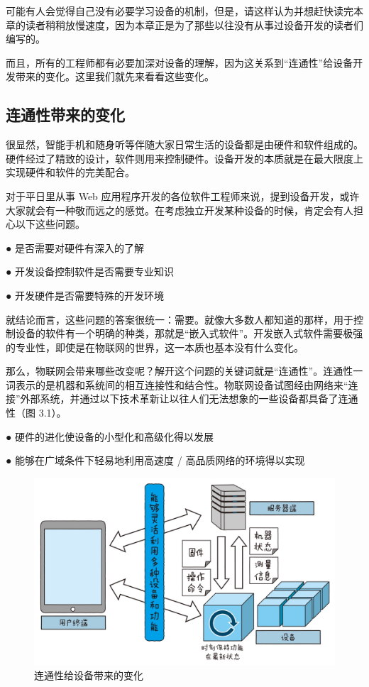 \documentclass[12pt,UTF8]{ctexbook}
\begin{document}
可能有人会觉得自己没有必要学习设备的机制，但是，请这样认为并想赶快读完本章的读者稍稍放慢速度，因为本章正是为了那些以往没有从事过设备开发的读者们编写的。

而且，所有的工程师都有必要加深对设备的理解，因为这关系到“连通性”给设备开发带来的变化。这里我们就先来看看这些变化。

\subsection{连通性带来的变化}

很显然，智能手机和随身听等伴随大家日常生活的设备都是由硬件和软件组成的。硬件经过了精致的设计，软件则用来控制硬件。设备开发的本质就是在最大限度上实现硬件和软件的完美配合。

对于平日里从事 Web 应用程序开发的各位软件工程师来说，提到设备开发，或许大家就会有一种敬而远之的感觉。在考虑独立开发某种设备的时候，肯定会有人担心以下这些问题。

● 是否需要对硬件有深入的了解

● 开发设备控制软件是否需要专业知识

● 开发硬件是否需要特殊的开发环境

就结论而言，这些问题的答案很统一：需要。就像大多数人都知道的那样，用于控制设备的软件有一个明确的种类，那就是“嵌入式软件”。开发嵌入式软件需要极强的专业性，即使是在物联网的世界，这一本质也基本没有什么变化。

那么，物联网会带来哪些改变呢？解开这个问题的关键词就是“连通性”。连通性一词表示的是机器和系统间的相互连接性和结合性。物联网设备试图经由网络来“连接”外部系统，并通过以下技术革新让以往人们无法想象的一些设备都具备了连通性（图 3.1）。

● 硬件的进化使设备的小型化和高级化得以发展

● 能够在广域条件下轻易地利用高速度 / 高品质网络的环境得以实现

\begin{figure}[htbp]
	\centering
	\includegraphics[width=1\linewidth]{52}
	\caption{连通性给设备带来的变化}
	\label{fig:1}
\end{figure}
\end{document}
